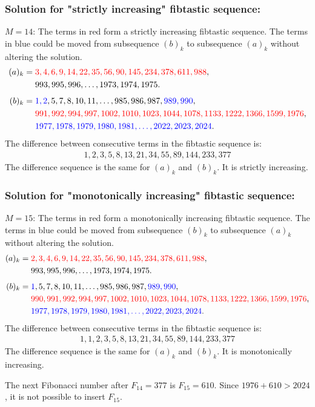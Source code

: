 \subsubsection*{Solution for "strictly increasing" fibtastic sequence:}
$M=14$: The terms in red form a strictly increasing fibtastic sequence. The terms in blue could be moved from subsequence $(b)_{k}$ to subsequence $(a)_{k}$ without altering the solution. 
\begin{align*}
(a)_{k} 
& = \textcolor{red}{3, 4, 6, 9, 14, 22, 35, 56, 90, 145, 234, 378, 611, 988},
\\ 
& \quad\
993, 995, 996, \ldots, 1973, 1974, 1975.
\\[1ex] 
(b)_{k} 
& = \textcolor{blue}{1, 2}, 
5, 7, 8, 10, 11, \ldots, 985, 986, 987,
\textcolor{blue}{989, 990}, 
\\
& \quad\
\textcolor{red}{991, 992, 994, 997, 1002, 1010, 1023, 1044, 1078, 1133, 1222, 1366, 1599, 1976}, 
\\
& \quad\
\textcolor{blue}{1977, 1978, 1979, 1980, 1981, \ldots, 2022, 2023, 2024}.
\end{align*}
The difference between consecutive terms in the fibtastic sequence is:
\begin{align*}
1, 2, 3, 5, 8, 13, 21, 34, 55, 89, 144, 233, 377
\end{align*}
The difference sequence is the same for $(a)_{k}$ and $(b)_{k}$. It is strictly increasing. 

\subsubsection*{Solution for "monotonically increasing" fibtastic sequence:}
$M=15$: The terms in red form a monotonically increasing fibtastic sequence. The terms in blue could be moved from subsequence $(b)_{k}$ to subsequence $(a)_{k}$ without altering the solution. 
\begin{align*}
(a)_{k} 
& = \textcolor{red}{2, 3, 4, 6, 9, 14, 22, 35, 56, 90, 145, 234, 378, 611, 988},
\\ 
& \quad\
993, 995, 996, \ldots, 1973, 1974, 1975.
\\[1ex] 
(b)_{k} 
& = \textcolor{blue}{1}, 
5, 7, 8, 10, 11, \ldots, 985, 986, 987,
\textcolor{blue}{989, 990}, 
\\
& \quad\
\textcolor{red}{990, 991, 992, 994, 997, 1002, 1010, 1023, 1044, 1078, 1133, 1222, 1366, 1599, 1976}, 
\\
& \quad\
\textcolor{blue}{1977, 1978, 1979, 1980, 1981, \ldots, 2022, 2023, 2024}.
\end{align*}
The difference between consecutive terms in the fibtastic sequence is:
\begin{align*}
1, 1, 2, 3, 5, 8, 13, 21, 34, 55, 89, 144, 233, 377
\end{align*}
The difference sequence is the same for $(a)_{k}$ and $(b)_{k}$. It is monotonically increasing. 

The next Fibonacci number after $F_{14}=377$ is $F_{15}=610$. Since $1976+610>2024$, it is not possible to insert $F_{15}$. 
